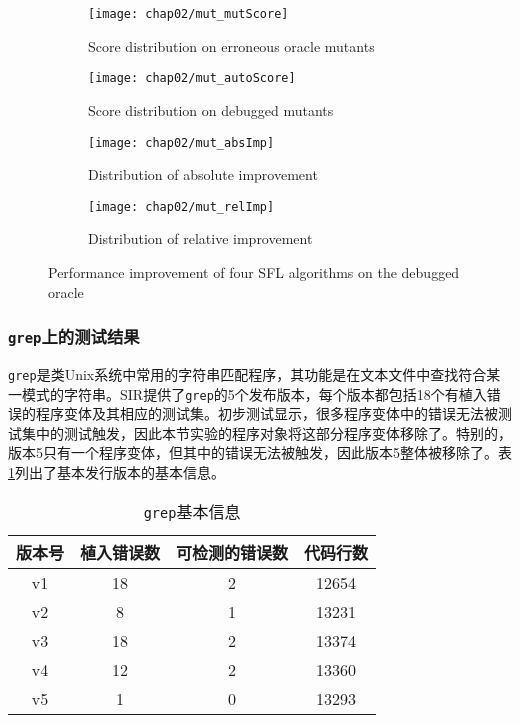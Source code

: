 \begin{figure}
	\centering
	\begin{subfigure}{15cm}
		\texttt{[image: chap02/mut\_mutScore]}
		\caption{Score distribution on erroneous oracle mutants}
		\label{fig: mutScore}
	\end{subfigure}%
\hspace{0.5cm}
	\begin{subfigure}{15cm}
		\texttt{[image: chap02/mut\_autoScore]}
		\caption{Score distribution on debugged mutants}
		\label{fig: autoScore}
	\end{subfigure}%
\hspace{0.5cm}
	\begin{subfigure}{15cm}
		\texttt{[image: chap02/mut\_absImp]}
		\caption{Distribution of absolute improvement}
		\label{fig: mut-absImp}
	\end{subfigure}%
\hspace{0.5cm}
	\begin{subfigure}{15cm}
		\texttt{[image: chap02/mut\_relImp]}
		\caption{Distribution of relative improvement}
		\label{fig: mut-relImp}
	\end{subfigure}%
	
	\caption{Performance improvement of four SFL algorithms on the debugged oracle}
	\label{fig: perfomance_improvement}	
\end{figure}
\subsubsection{\texttt{grep}上的测试结果}

\texttt{grep}是类Unix系统中常用的字符串匹配程序，其功能是在文本文件中查找符合某一模式的字符串。SIR\cite{doESE05}提供了\texttt{grep}的5个发布版本，每个版本都包括18个有植入错误的程序变体及其相应的测试集。初步测试显示，很多程序变体中的错误无法被测试集中的测试触发，因此本节实验的程序对象将这部分程序变体移除了。特别的，版本5只有一个程序变体，但其中的错误无法被触发，因此版本5整体被移除了。表\ref{Tab: grep-info}列出了基本发行版本的基本信息。

\begin{table}
	\caption{\texttt{grep}基本信息} \label{Tab: grep-info}
	\centering
	\begin{tabular}{c|c|c|c}
		\hline 版本号 & 植入错误数 & 可检测的错误数 & 代码行数 \\ 
		\hline v1 & 18 & 2 & 12654 \\ 
		\hline v2 & 8 & 1 & 13231 \\ 
		\hline v3 & 18 & 2 & 13374 \\ 
		\hline v4 & 12 & 2 & 13360 \\ 
		\hline v5 & 1 & 0 & 13293 \\ 
		\hline
	\end{tabular} 
\end{table}

